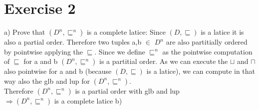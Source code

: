 \documentclass[]{article}
\begin{document}
	\section*{Exercise 2}
	a) 
	Prove that $(D^n,\sqsubseteq^n)$ is a complete latice:
	Since $(D,\sqsubseteq)$ is a latice it is also a partial order. Therefore two tuples a,b $\in$ $D^n$ are also partitially ordered by pointwise applying the $\sqsubseteq$. Since we define $\sqsubseteq^n$ as the pointwise computation of $\sqsubseteq$ for a and b $(D^n,\sqsubseteq^n)$ is a partitial order. As we can execute the $\sqcup$ and $\sqcap$ also pointwise for a and b (because $(D,\sqsubseteq)$ is a latice), we can compute in that way also the glb and lup for $(D^n,\sqsubseteq^n)$.\\
	Therefore $(D^n,\sqsubseteq^n)$ is a partial order with glb and lup\\
	$\Rightarrow (D^n,\sqsubseteq^n)$ is a complete latice
	b)\\
\end{document}
